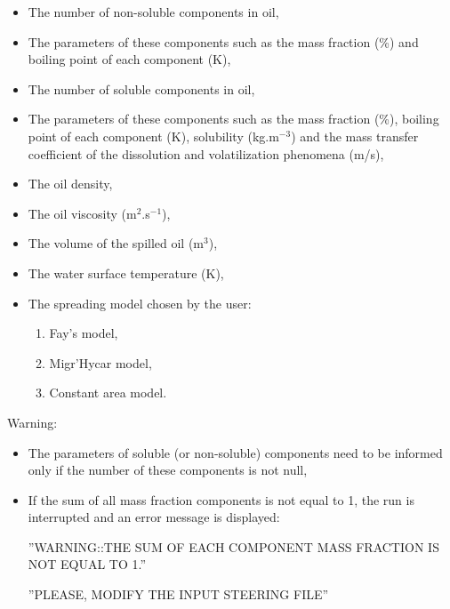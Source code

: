 \begin{itemize}
\item The number of non-soluble components in oil,

\item The parameters of these components such as the mass fraction (\%)
and boiling point of each component (K),

\item The number of soluble components in oil,

\item The parameters of these components such as the mass fraction (\%),
boiling point of each component (K), solubility (kg.m$^{-3}$) and the
mass transfer coefficient of the dissolution and volatilization phenomena (m/s),

\item The oil density,

\item The oil viscosity (m$^2$.s$^{-1}$),

\item The volume of the spilled oil (m$^3$),

\item The water surface temperature (K),

\item The spreading model chosen by the user:

\begin{enumerate}
\item Fay's model,

\item Migr'Hycar model,

\item Constant area model.
\end{enumerate}
\end{itemize}

\begin{WarningBlock}{Warning:}
\begin{itemize}
\item The parameters of soluble (or non-soluble) components need to be informed
only if the number of these components is not null,

\item If the sum of all mass fraction components is not equal to 1, the run is
interrupted and an error message is displayed:

 ''WARNING::THE SUM OF EACH COMPONENT MASS FRACTION IS NOT EQUAL TO 1.''

 ''PLEASE, MODIFY THE INPUT STEERING FILE''
\end{itemize}
\end{WarningBlock}

